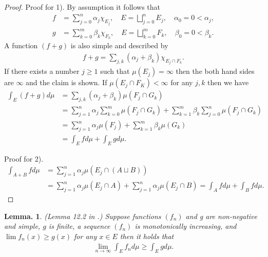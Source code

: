 \documentclass[openany, a4paper, oneside]{jsbook}
\theoremstyle{break}
\theoremstyle{breakdefn}
\newtheorem{lem}[thm]{Lemma.}
\newcommand{\rbk}[1]{\left (#1\right)}
\begin{document}
\begin{proof}
Proof for 1).
By assumption it follows that
\begin{align}
  f
  &=
  \sum_{j=0}^n \alpha_j \chi_{E_j}, \quad
  E
  =
  \bigsqcup_{j=0}^{n} E_j, \quad
  \alpha_0 = 0 < \alpha_j, \\
  g
  &=
  \sum_{k=0}^m \beta_k \chi_{F_k}, \quad
  E
  =
  \bigsqcup_{k=0}^{m} F_k, \quad
  \beta_0 = 0 < \beta_k.
\end{align}
A function $(f+g)$ is also simple and described by
\begin{align}
  f + g
  =
  \sum_{j,k} (\alpha_j + \beta_k) \chi_{E_j \cap F_k}.
\end{align}
If there exists a number $j \geq 1$ such that $\mu (E_j) = \infty$ then
the both hand sides are $\infty$ and the claim is shown.
If $\mu (E_j \cap F_K) < \infty$ for any $j,k$ then we have
\begin{align}
 \int_E (f+g) d\mu
 &=
 \sum_{j,k} \rbk{\alpha_j + \beta_k} \mu (F_j \cap G_k) \\
 &=
 \sum_{j=1}^n \alpha_j \sum_{k=0}^m \mu (F_j \cap G_k) + \sum_{k=1}^m \beta_k \sum_{j=0}^n \mu (F_j \cap G_k) \\
 &=
 \sum_{j=1}^n \alpha_j \mu (F_j) + \sum_{k=1}^m \beta_k \mu (G_k) \\
 &=
 \int_E f d\mu + \int_E g d\mu.
\end{align}

Proof for 2).
\begin{align}
 \int_{A+B} f d \mu
 &=
 \sum_{j=1}^n \alpha_j \mu \rbk{E_j \cap \rbk{A \sqcup B}} \\
 &=
 \sum_{j=1}^n \alpha_j \mu \rbk{E_j \cap A} + \sum_{j=1}^n \alpha_j \mu \rbk{E_j \cap B}
 =
 \int_A f d\mu + \int_B f d\mu.
\end{align}
\end{proof}
\begin{lem}\textup{(Lemma 12.2 in \cite{SeizoIto1}.)}
 Suppose functions $(f_n)$ and g are non-negative and simple, $g$ is finite, a sequence $(f_n)$ is monotonically increasing, and
 $\lim f_n (x) \geq g (x)$ for any $x \in E$ then it holds that
 \begin{align}
  \lim_{n \to \infty} \int_E f_n d \mu
  \geq
  \int_E g d\mu.
 \end{align}
\end{lem}
\end{document}
